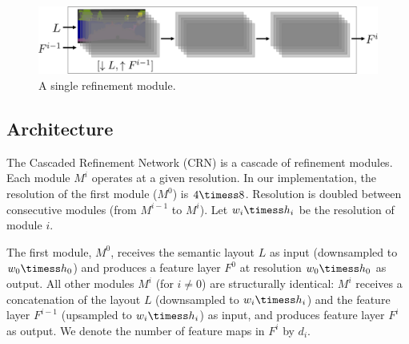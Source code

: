 

\begin{figure}[t]
  \centering
  \includegraphics[width=1\linewidth]{figures/diagram2.pdf}
  \caption{A single refinement module.}
\label{fig:module}
\vspace{-1mm}
\end{figure}


\subsection{Architecture}
\label{sec:architecture}

The Cascaded Refinement Network (CRN) is a cascade of refinement modules. Each module $M^i$ operates at a given resolution. In our implementation, the resolution of the first module ($M^0$) is $4\timess 8$. Resolution is doubled between consecutive modules (from $M^{i-1}$ to $M^i$). Let $w_i \timess h_i$ be the resolution of module $i$.

The first module, $M^0$, receives the semantic layout $L$ as input (downsampled to $w_0 \timess h_0$) and produces a feature layer $F^0$ at resolution $w_0 \timess h_0$ as output. All other modules $M^i$ (for ${i\ne 0}$) are structurally identical: $M^i$ receives a concatenation of the layout $L$ (downsampled to $w_i \timess h_i$) and the feature layer $F^{i-1}$ (upsampled to $w_i \timess h_i$) as input, and produces feature layer $F^i$ as output. We denote the number of feature maps in $F^i$ by $d_i$.

